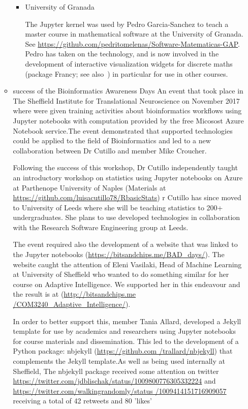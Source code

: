 \begin{enumerate}
\begin{itemize}
\begin{itemize}
  \item University of Granada
     
     The \GAP Jupyter kernel was used by Pedro Garcia-Sanchez to teach a master course in mathematical software at the University of
     Granada. See  \url{https://github.com/pedritomelenas/Software-Matematicas-GAP}. Pedro has taken on the technology, and is now involved
     in the   development of interactive visualization widgets for discrete maths (package Francy; see also~) in particular for use in other courses.
     
  \end{itemize}

\item success of the Bioinformatics Awareness Days
An event that took place in The Sheffield Institute for Translational Neuroscience on November 2017 where were given training activities 
about bioinformatics workflows using Jupyter notebooks with computation provided by the free Micosost Azure Notebook service.The event 
demonstrated that \ODK supported technologies could be applied to the field of Bioinformatics and led to a new collaboration between Dr 
Cutillo and \ODK member Mike Croucher.

Following the success of this workshop, Dr Cutillo independently taught an introductory workshop on statistics using Jupyter notebooks 
on Azure at Parthenope University of Naples (Materials at \url{https://github.com/luisacutillo78/RbasicStats}) r Cutillo has since moved 
to University of Leeds where she will be teaching statistics to 200+ undergraduates. She plans to use \ODK developed technologies 
in collaboration with the Research Software Engineering group at Leeds.

The event required also the development of a website that was linked to the Jupyter notebooks (\url{https://bitsandchips.me/BAD_days/}). The 
website caught the attention of Eleni Vasilaki, Head of Machine Learning at University of Sheffield who wanted to do something similar for 
her course on Adaptive Intelligence. We supported her in this endeavour and the result is at (\url{http://bitsandchips.me
/COM3240_Adaptive_Intelligence/}).

In order to better support this, \ODK member Tania Allard, developed a Jekyll template for use by academics and researchers using Jupyter 
notebooks for course materials and dissemination. This led to the development of a Python package: nbjekyll (\url{https://github.com
/trallard/nbjekyll}) that complements the Jekyll template.As well as being used internally at Sheffield, The nbjekyll package received some 
attention on twitter \url{https://twitter.com/jdblischak/status/1009800776305332224} and \url{https://twitter.com/walkingrandomly/status
/1009414151716909057} receiving a total of 42 retweets and 80 'likes'%
  

\end{itemize}
\end{enumerate}
